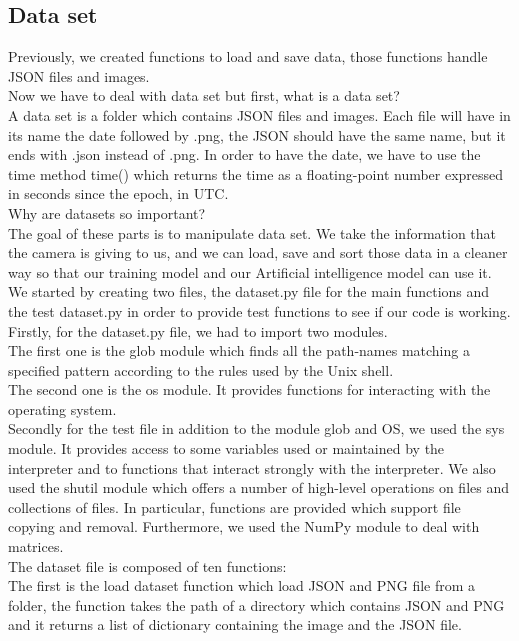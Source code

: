 \documentclass[12pt]{article}
\begin{document}
\subsection{Data set}
Previously, we created functions to load and save data, those functions handle JSON files and images. \\ 
Now we have to deal with data set but first, what is a data set? \\  
A data set is a folder which contains JSON files and images. Each file will have in its name the date followed by .png, the JSON should have the same name, but it ends with .json instead of .png. In order to have the date, we have to use the time method time() which returns the time as a floating-point number expressed in seconds since the epoch, in UTC.\\ 
Why are datasets so important? \\  
The goal of these parts is to manipulate data set. We take the information that the camera is giving to us, and we can load, save and sort those data in a cleaner way so that our training model and our Artificial intelligence model can use it.\\ 
We started by creating two files, the dataset.py file for the main functions and the test dataset.py in order to provide test functions to see if our code is working.\\ 
Firstly, for the dataset.py file, we had to import two modules. \\ 
The first one is the glob module which finds all the path-names matching a specified pattern according to the rules used by the Unix shell.\\
The second one is the os module. It provides functions for interacting with the operating system.\\ 
Secondly for the test file in addition to the module glob and OS, we used the sys module. It provides access to some variables used or maintained by the interpreter and to functions that interact strongly with the interpreter. 
We also used the shutil module which offers a number of high-level operations on files and collections of files. In particular, functions are provided which support file copying and removal. Furthermore, we used the NumPy module to deal with matrices.\\ 
The dataset file is composed of ten functions:\\  
The first is the load dataset function which load JSON and PNG file from a folder, the function takes the path of a directory which contains JSON and PNG and it returns a list of dictionary containing the image and the JSON file.\\ 
\end{document}

